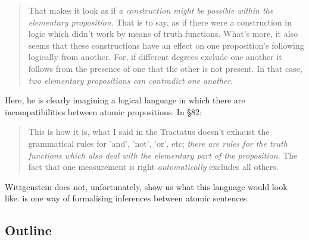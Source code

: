 \begin{quote}
  That makes it look as if \emph{a construction might be possible
    within the elementary proposition}. That is to say, as if there
  were a construction in logic which didn't work by means of truth
  functions.  What's more, it also seems that these constructions have
  an effect on one proposition's following logically from another.
  For, if different degrees exclude one another it follows from the
  presence of one that the other is not present.  In that case,
  \emph{two elementary propositions can contradict one another}.
\end{quote}

\NI Here, he is clearly imagining a logical language in which there
are incompatibilities between atomic propositions. In \S 82:

\begin{quote}
  This is how it is, what I said in the Tractatus doesn't exhaust the
  grammatical rules for 'and', 'not', 'or', etc; \emph{there are rules
    for the truth functions which also deal with the elementary part
    of the proposition}.  The fact that one measurement is right
  \emph{automatically} excludes all others.
\end{quote}

\NI Wittgenstein does not, unfortunately, show us what this
language would look like.  \Cathoristic{} is one way of formalising inferences
between atomic sentences.

\subsection{Outline}

